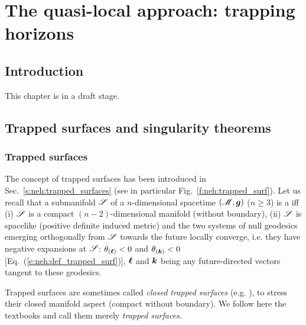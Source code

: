 \chapter{The quasi-local approach: trapping horizons}
\label{s:loc}

\minitoc

\section{Introduction}

This chapter is in a draft stage.

\section{Trapped surfaces and singularity theorems}

\subsection{Trapped surfaces} \label{s:loc:trapped_surf}

The concept of trapped surfaces has been introduced in Sec.~\ref{s:neh:trapped_surfaces}
(see in particular Fig.~\ref{f:neh:trapped_surf}). Let us recall that
a submanifold $\mathscr{S}$ of a $n$-dimensional spacetime $(\mathscr{M}, \bm{g})$ ($n\ge 3$) is
a  iff (i) $\mathscr{S}$ is a compact $(n-2)$-dimensional manifold
(without boundary), (ii) $\mathscr{S}$ is spacelike (positive definite induced metric)
and the two systems of null geodesics emerging orthogonally from $\mathscr{S}$ towards the future
locally converge, i.e. they have negative expansions at $\mathscr{S}$:
$\theta_{(\bm{\ell})} < 0$ and $\theta_{(\bm{k})} < 0$ [Eq.~(\ref{e:neh:def_trapped_surf})],
$\bm{\ell}$ and $\bm{k}$ being
any future-directed vectors tangent to these geodesics.

\begin{remark}
Trapped surfaces are sometimes called
\emph{closed trapped surfaces} (e.g. \cite{Penro65,HawkiE73}),
to stress their closed manifold aspect (compact without boundary).
We follow here the textbooks \cite{MisneTW73,Wald84} and call them merely
\emph{trapped surfaces}.
\end{remark}

